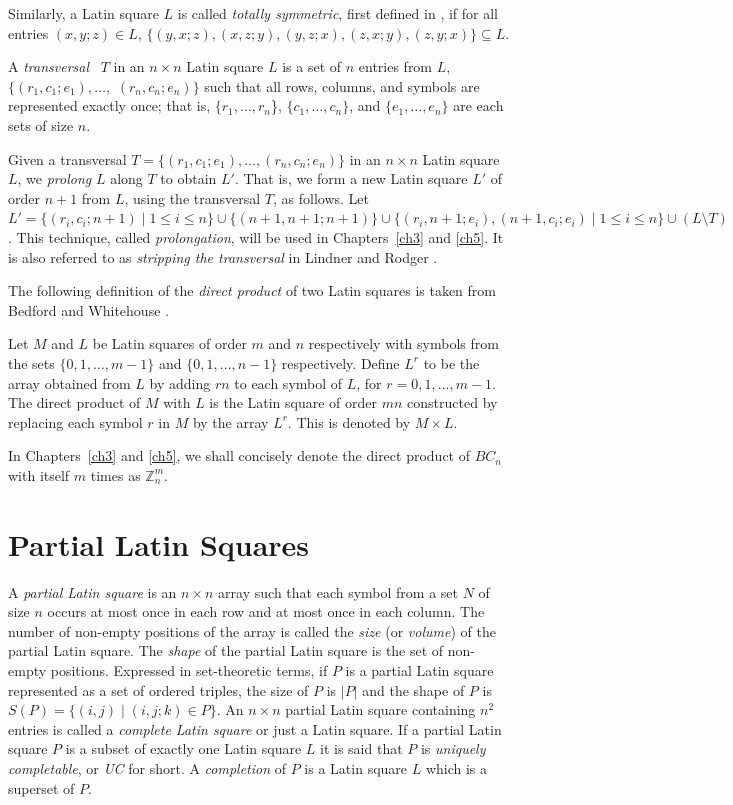\documentclass[12pt]{report}
\begin{document}
Similarly, a Latin square $L$ is called {\it totally symmetric}, first defined in \cite{MR80a:05032},
if for all entries $(x, y; z) \in L$, $\{ (y, x; z), (x, z; y), 
(y, z; x), (z, x; y), (z, y; x) \} \subseteq L$. 

A {\it transversal} ~$T$ in an $n \times n$ Latin square $L$ is a
set of $n$ entries from $L$, $\{(r_1,c_1;e_1),\dots,$ $(r_n,c_n;e_n)\}$
such that all rows, columns, and symbols are represented exactly once;
that is, $\{r_1,\dots,r_n$\}, $\{c_1,\dots,c_n\}$, and $\{e_1,\dots,e_n\}$
are each sets of size $n$.

Given a transversal $T = \{ (r_1,c_1;e_1), \dots, (r_n,c_n;e_n) \}$
in an $n \times n$ Latin square $L$, we {\it prolong} $L$ along $T$ to
obtain $L'$.  That is, we form a new Latin square $L'$ of order $n+1$ from
$L$, using the transversal $T$, as follows.  Let $L' = \{ (r_i,c_i;n+1)
\mid 1 \leq i \leq n \} \cup \{ (n+1,n+1;n+1) \} \cup \{ (r_i, n+1;
e_i), (n+1, c_i; e_i) \mid 1 \leq i \leq n \} \cup (L \setminus T)$.
This technique, called {\it prolongation}, will be used in Chapters~\ref{ch3} and \ref{ch5}.
It is also referred to as {\it stripping the transversal} in Lindner
and Rodger \cite{dt}.

The following definition of the {\it direct product} of two Latin squares
is taken from Bedford and Whitehouse \cite{bandw}.

Let $M$ and $L$ be Latin squares of order $m$ and $n$ respectively
with symbols from the sets $ \{ 0, 1, \dots, m-1 \}$ and
$ \{ 0, 1, \dots, n-1 \}$ respectively.  Define $L^r$ to be the array
obtained from $L$ by adding $rn$ to each symbol of $L$, for 
$r = 0, 1, \dots, m-1$.  The direct product of $M$ with $L$ is the
Latin square of order $mn$ constructed by replacing each symbol $r$ in $M$
by the array $L^r$.  This is denoted by $M \times L$.

In Chapters~\ref{ch3} and \ref{ch5}, we shall concisely denote the direct product of $BC_n$
with itself $m$ times as ${\mathbb Z}_n^m$.

\section{Partial Latin Squares}
A {\it partial Latin square} is an $n \times n$ array such that each
symbol from a set $N$ of size $n$ occurs at most once in each row and at
most once in each column.  The number of non-empty positions of the array
is called the {\it size} (or {\it volume}) of the partial Latin square.
The {\it shape} of the partial Latin square is the set of non-empty
positions.  Expressed in set-theoretic terms, if $P$ is a partial Latin
square represented as a set of ordered triples, the size of $P$ is $|P|$ and the shape of $P$ is $S(P) = \{
(i,j) \mid (i,j;k) \in P \}$.  An $n \times n$ partial Latin square containing $n^2$
entries is called a {\it complete Latin square} or just a Latin square.
If a partial Latin square $P$ is a subset of exactly one Latin square $L$
it is said that $P$ is {\it uniquely completable}, or {\it UC} for short.  A {\it completion}
of $P$ is a Latin square $L$ which is a superset of $P$.
\end{document}
